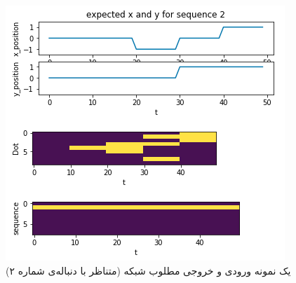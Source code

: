 \documentclass[a4paper]{article}
\begin{document}
\begin{figure}[h!]
	\centering
	\includegraphics[scale=0.7]{fig13.png}
	\caption{یک نمونه ورودی و خروجی مطلوب شبکه (متناظر با دنباله‌ی شماره ۲)}
	\label{fig13}
\end{figure}
\end{document}
